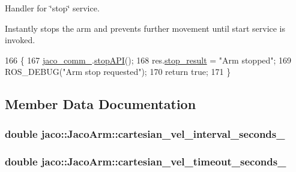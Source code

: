 Handler for \char`\"{}stop\char`\"{} service. 

Instantly stops the arm and prevents further movement until start service is invoked. 
\begin{DoxyCode}
166 \{
167     \hyperlink{classjaco_1_1JacoArm_a2f9cbba855994058b82c0f4628349286}{jaco\_comm\_}.\hyperlink{classjaco_1_1JacoComm_a54862830cd6414ae3ae48e46e54bf798}{stopAPI}();
168     res.\hyperlink{structjaco__msgs_1_1StopResponse___a9dc418ecf2ecbae176732d3fdf6e7b66}{stop\_result} = \textcolor{stringliteral}{"Arm stopped"};
169     ROS\_DEBUG(\textcolor{stringliteral}{"Arm stop requested"});
170     \textcolor{keywordflow}{return} \textcolor{keyword}{true};
171 \}
\end{DoxyCode}


\subsection{Member Data Documentation}
\subsubsection[{\texorpdfstring{cartesian\+\_\+vel\+\_\+interval\+\_\+seconds\+\_\+}{cartesian_vel_interval_seconds_}}]{\setlength{\rightskip}{0pt plus 5cm}double jaco\+::\+Jaco\+Arm\+::cartesian\+\_\+vel\+\_\+interval\+\_\+seconds\+\_\+\hspace{0.3cm}{\ttfamily [private]}}\hypertarget{classjaco_1_1JacoArm_aa111ac63977d9a50b7e707b4a9e75e20}{}\label{classjaco_1_1JacoArm_aa111ac63977d9a50b7e707b4a9e75e20}
\subsubsection[{\texorpdfstring{cartesian\+\_\+vel\+\_\+timeout\+\_\+seconds\+\_\+}{cartesian_vel_timeout_seconds_}}]{\setlength{\rightskip}{0pt plus 5cm}double jaco\+::\+Jaco\+Arm\+::cartesian\+\_\+vel\+\_\+timeout\+\_\+seconds\+\_\+\hspace{0.3cm}{\ttfamily [private]}}\hypertarget{classjaco_1_1JacoArm_a822ad8d6fcc8719c5a090456998e832a}{}\label{classjaco_1_1JacoArm_a822ad8d6fcc8719c5a090456998e832a}
